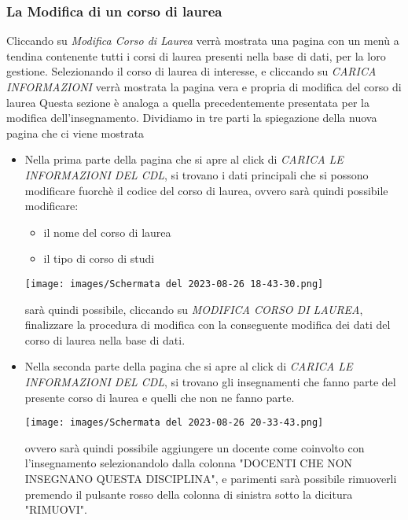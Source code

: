 \documentclass{article}
\begin{document}
    \subsubsection{La Modifica di un corso di laurea}
    Cliccando su \textit{Modifica Corso di Laurea} verrà mostrata una pagina con un menù a tendina contenente tutti i corsi di laurea presenti nella base di dati, per la loro gestione. Selezionando il corso di laurea di interesse, e cliccando su \textit{CARICA INFORMAZIONI} verrà mostrata la pagina vera e propria di modifica del corso di laurea
    Questa sezione è analoga a quella precedentemente presentata per la modifica dell'insegnamento.
    Dividiamo in tre parti la spiegazione della nuova pagina che ci viene mostrata
    \begin{itemize}
        \item Nella prima parte della pagina che si apre al click di \textit{CARICA LE INFORMAZIONI DEL CDL}, si trovano i dati principali che si possono modificare fuorchè il codice del corso di laurea, ovvero sarà quindi possibile modificare:
        \begin{itemize}
            \item il nome del corso di laurea
            \item il tipo di corso di studi
        \end{itemize}

        \begin{center}
            \texttt{[image: images/Schermata del 2023-08-26 18-43-30.png]}
        \end{center}

        sarà quindi possibile, cliccando su \textit{MODIFICA CORSO DI LAUREA}, finalizzare la procedura di modifica con la conseguente modifica dei dati del corso di laurea nella base di dati.

        \item Nella seconda parte della pagina che si apre al click di \textit{CARICA LE INFORMAZIONI DEL CDL}, si trovano gli insegnamenti che fanno parte del presente corso di laurea e quelli che non ne fanno parte.

        \begin{center}
            \texttt{[image: images/Schermata del 2023-08-26 20-33-43.png]}
        \end{center}

        ovvero sarà quindi possibile aggiungere un docente come coinvolto con l'insegnamento selezionandolo dalla colonna "DOCENTI CHE NON INSEGNANO QUESTA DISCIPLINA", e parimenti sarà possibile rimuoverli premendo il pulsante rosso della colonna di sinistra sotto la dicitura "RIMUOVI".


\end{itemize}
\end{document}
